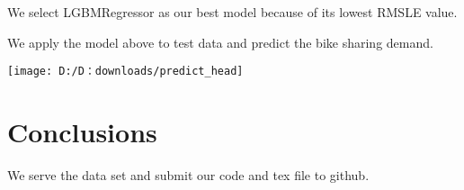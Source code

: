 \vspace{.5cm}

We select LGBMRegressor as our best model because of its lowest RMSLE value.

We apply the model above to test data and predict the bike sharing demand.


\begin{center}
	\texttt{[image: D:/D：downloads/predict\_head]}
\end{center}


\section{Conclusions} \label{sec-conclusions}


We serve the data set and submit our code and tex file to github.






